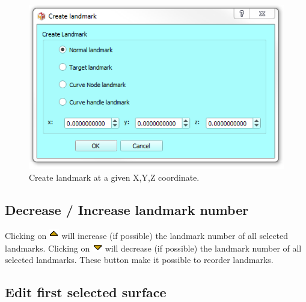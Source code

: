 \begin{figure}
  \centering
  \includegraphics[scale=0.55]{images/06/objects/create_landmark.png} 
	\caption{Create landmark at a given X,Y,Z coordinate.}
\label{create_landmark}
 
\end{figure}
\subsection{Decrease / Increase landmark number}
Clicking on \includegraphics[scale=0.7]{images/06/objects/move_up.png} will increase (if possible) the landmark number of all selected landmarks. Clicking on \includegraphics[scale=0.7]{images/06/objects/move_down.png} will decrease (if possible) the landmark number of all selected landmarks. These button make it possible to reorder landmarks.
\subsection{Edit first selected surface}

